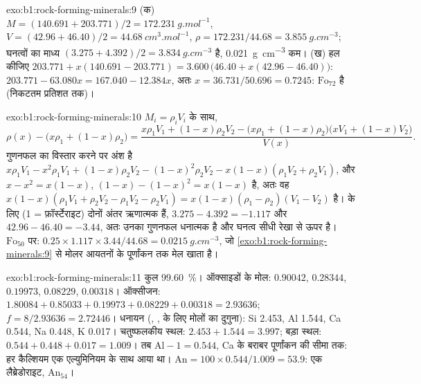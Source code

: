 \begin{solution}{exo:b1:rock-forming-minerals:9}
(क) $M = (140.691 + 203.771)/2 = \qty{172.231}{g.mol^{-1}}$, $V = (42.96 +
46.40)/2 = \qty{44.68}{cm^3.mol^{-1}}$, $\rho = 172.231/44.68 =
\qty{3.855}{g.cm^{-3}}$; घनत्वों का माध्य $(3.275 + 4.392)/2 =
\qty{3.834}{g.cm^{-3}}$ है, \qty{0.021}{g.cm^{-3}} कम। (ख) हल कीजिए
$203.771 + x(140.691 - 203.771) = 3.600\,\bigl(46.40 + x(42.96 - 46.40)\bigr)$:
$203.771 - 63.080x = 167.040 - 12.384x$, अतः $x = 36.731/50.696 = 0.7245$: 
$\text{Fo}_{72}$ है (निकटतम प्रतिशत तक)।
\end{solution}

\begin{solution}{exo:b1:rock-forming-minerals:10}
$M_i = \rho_i V_i$ के साथ,
\[
  \rho(x) - \bigl(x\rho_1 + (1 - x)\rho_2\bigr)
  = \frac{x\rho_1V_1 + (1 - x)\rho_2V_2 - \bigl(x\rho_1 + (1 - x)\rho_2\bigr)\bigl(xV_1 + (1 - x)V_2\bigr)}{V(x)} .
\]
गुणनफल का विस्तार करने पर अंश है $x\rho_1V_1 - x^2\rho_1V_1 +
(1 - x)\rho_2V_2 - (1 - x)^2\rho_2V_2 - x(1 - x)(\rho_1V_2 + \rho_2V_1)$, और
$x - x^2 = x(1 - x)$, $(1 - x) - (1 - x)^2 = x(1 - x)$ है, अतः वह
$x(1 - x)(\rho_1V_1 + \rho_2V_2 - \rho_1V_2 - \rho_2V_1) =
x(1 - x)(\rho_1 - \rho_2)(V_1 - V_2)$ है।  के लिए (1 = फ़ॉर्स्टेराइट) दोनों अंतर ऋणात्मक हैं,
$3.275 - 4.392 = -1.117$ और $42.96 - 46.40 =
-3.44$, अतः उनका गुणनफल धनात्मक है और घनत्व सीधी रेखा से ऊपर है। $\text{Fo}_{50}$ पर:
$0.25\times1.117\times3.44/44.68 =
\qty{0.0215}{g.cm^{-3}}$, जो \cref{exo:b1:rock-forming-minerals:9} से मोलर आयतनों के पूर्णांकन तक मेल खाता है।
\end{solution}

\begin{solution}{exo:b1:rock-forming-minerals:11}
कुल \qty{99.60}{\percent}। ऑक्साइडों के मोल:  $0.90042$,
 $0.28344$,  $0.19973$,  $0.08229$,
 $0.00318$। ऑक्सीजन: $1.80084 + 0.85033 + 0.19973 + 0.08229 +
0.00318 = 2.93636$; $f = 8/2.93636 = 2.72446$। धनायन (, ,  के लिए मोलों का दुगुना): Si \num{2.453}, Al \num{1.544}, Ca
\num{0.544}, Na \num{0.448}, K \num{0.017}। चतुष्फलकीय स्थल:
$2.453 + 1.544 = 3.997$; बड़ा स्थल: $0.544 + 0.448 + 0.017 = 1.009$। तब
$\mathrm{Al} - 1 = 0.544$, Ca के बराबर पूर्णांकन की सीमा तक: हर कैल्शियम एक एल्युमिनियम के साथ आया था। $\mathrm{An} = 100\times0.544/1.009 = 53.9$: एक
लैब्रेडोराइट, $\text{An}_{54}$।
\end{solution}

